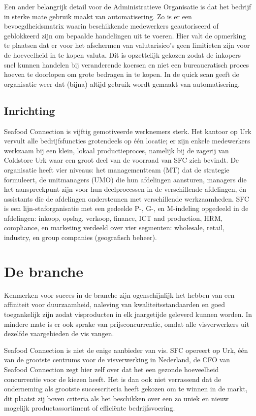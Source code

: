 \documentclass[10pt,a4paper,oneside]{report}
\begin{document}
Een ander belangrijk detail voor de Administratieve Organisatie is dat het bedrijf in sterke mate gebruik maakt van automatisering. Zo is er een bevoegdheidsmatrix waarin beschikkende medewerkers geautoriseerd of geblokkeerd zijn om bepaalde handelingen uit te voeren. Hier valt de opmerking te plaatsen dat er voor het afschermen van valutarisico's geen limitieten zijn voor de hoeveelheid in te kopen valuta. Dit is opzettelijk gekozen zodat de inkopers snel kunnen handelen bij veranderende koersen en niet een bureaucratisch proces hoeven te doorlopen om grote bedragen in te kopen. In de quick scan geeft de organisatie weer dat (bijna) altijd gebruik wordt gemaakt van automatisering. \citep{quickscan}

\subsection{Inrichting}
Seafood Connection is vijftig gemotiveerde werknemers sterk. Het kantoor op Urk vervult alle bedrijfsfuncties grotendeels op één locatie; er zijn enkele medewerkers werkzaam bij een klein, lokaal productieproces, namelijk bij de zagerij van Coldstore Urk waar een groot deel van de voorraad van SFC zich bevindt. De organisatie heeft vier niveaus: het managementteam (MT) dat de strategie formuleert, de unitmanagers (UMO) die hun afdelingen aansturen, managers die het aanspreekpunt zijn voor hun deelprocessen in de verschillende afdelingen, én assistants die de afdelingen ondersteunen met verschillende werkzaamheden. SFC is een lijn-staforganisatie met een gedeelde P-, G-, en M-indeling opgedeeld in de afdelingen: inkoop, opslag, verkoop, finance, ICT and production, HRM, compliance, en marketing verdeeld over vier segmenten: wholesale, retail, industry, en group companies (geografisch beheer). \citep{quickscan}

\section{De branche}
Kenmerken voor succes in de branche zijn ogenschijnlijk het hebben van een affiniteit voor duurzaamheid, naleving van kwaliteitsstandaarden en goed toegankelijk zijn zodat visproducten in elk jaargetijde geleverd kunnen worden. In mindere mate is er ook sprake van prijsconcurrentie, omdat alle visverwerkers uit dezelfde vaargebieden de vis vangen. 

Seafood Connection is niet de enige aanbieder van vis. SFC opereert op Urk, één van de grootste centrums voor de visverwerking in Nederland, de CFO van Seafood Connection zegt hier zelf over dat het een gezonde hoeveelheid concurrentie voor de kiezen heeft. Het is dan ook niet verrassend dat de onderneming als grootste succescriteria heeft gekozen om te winnen in de markt, dit plaatst zij boven criteria als het beschikken over een zo uniek en nieuw mogelijk productassortiment of efficiënte bedrijfsvoering. 
\end{document}
